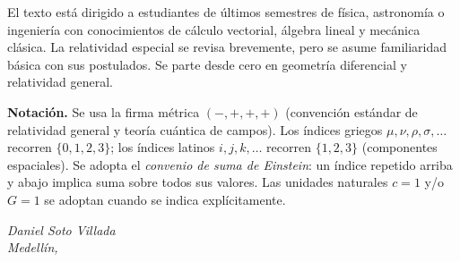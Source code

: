 \documentclass[12pt,oneside]{book}
\begin{document}
\medskip
El texto está dirigido a estudiantes de últimos semestres de física, astronomía o ingeniería con conocimientos de cálculo vectorial, álgebra lineal y mecánica clásica. La relatividad especial se revisa brevemente, pero se asume familiaridad básica con sus postulados. Se parte desde cero en geometría diferencial y relatividad general.

\medskip
\textbf{Notación.} Se usa la firma métrica $(-,+,+,+)$ (convención estándar de relatividad general y teoría cuántica de campos). Los índices griegos $\mu, \nu, \rho, \sigma, \ldots$ recorren $\{0,1,2,3\}$; los índices latinos $i,j,k,\ldots$ recorren $\{1,2,3\}$ (componentes espaciales). Se adopta el \emph{convenio de suma de Einstein}: un índice repetido arriba y abajo implica suma sobre todos sus valores. Las unidades naturales $c = 1$ y/o $G = 1$ se adoptan cuando se indica explícitamente.

\medskip
\begin{flushright}
\textit{Daniel Soto Villada}\\
\textit{Medellín, \the\year}
\end{flushright}

\tableofcontents
\clearpage

\clearpage
\hypersetup{pageanchor=true}
\mainmatter





















\backmatter
\printbibliography[heading=bibintoc, title={Referencias}]
\end{document}
